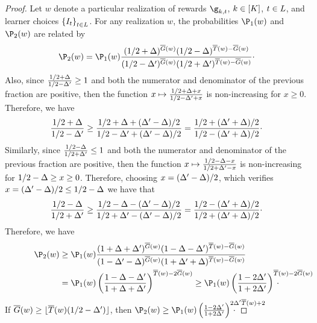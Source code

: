 \begin{proof}
	\noindent
	Let $w$ denote  a particular realization of rewards
	$\gainVector_{k,t}$, $k\in[K]$, $t\in L$, 
	and learner choices
	$\left\{I_t\right\}_{t\in L}$. For any realization
	$w$,
	the probabilities
	$\Pro_{1}(w)$ 
	and
	$\Pro_{2}(w)$
	are related by
	\[
	\Pro_{2}(w)
	=
	\Pro_{1}(w)\frac{(1/2+\gap)^{\sumlemma(w)} (1/2-\gap)^{\pullearlyPhase(w)-\sumlemma(w)}
	}{
		(1/2-\gap')^{\sumlemma(w)} (1/2+\gap')^{\pullearlyPhase(w)-\sumlemma(w)}}\cdot
	\]
	Also, since $\frac{1/2+\Delta}{1/2-\Delta'}\geq 1$ and both 
	the numerator and denominator of the previous fraction are 
	positive, then the function $x\mapsto\frac{1/2+\Delta+x}{1/2-\Delta'+x}$ 
	is non-increasing for $x\geq0$. Therefore, we have  
	\[
	\frac{1/2+\Delta}{1/2-\Delta'}
	\geq
	 \frac{1/2+\Delta+(\Delta'-\Delta)/2}{1/2-\Delta'+(\Delta'-\Delta)/2}
	 =
	  \frac{1/2+(\Delta'+\Delta)/2}{1/2-(\Delta'+\Delta)/2}\cdot
	\]
	Similarly, since $\frac{1/2-\Delta}{1/2+\Delta'}\leq 1$ 
	and both the numerator and denominator of the previous 
	fraction are positive, then the function 
	$x\mapsto\frac{1/2-\Delta-x}{1/2+\Delta'-x}$ is non-increasing 
	for $1/2-\Delta\geq x\geq0$. Therefore, choosing 
	$x=(\Delta'-\Delta)/2$, which verifies $x=(\Delta'-\Delta)/2\leq 1/2-\Delta$ we have  that
	\[
	\frac{1/2-\Delta}{1/2+\Delta'}
	\geq
	 \frac{1/2-\Delta-(\Delta'-\Delta)/2}{1/2+\Delta'-(\Delta'-\Delta)/2}
	 =
	  \frac{1/2-(\Delta'+\Delta)/2}{1/2+(\Delta'+\Delta)/2}\cdot
	\]
%	
	Therefore, we have 
	\begin{align*}
	\Pro_{2}(w)
	&\geq
	\Pro_{1}(w)
	\frac{(1+\gap+\gap')^{\sumlemma(w)} (1-\gap-\gap')^{\pullearlyPhase(w)-\sumlemma(w)}
	}{
		(1-\gap'-\gap)^{\sumlemma(w)} (1+\gap'+\gap)^{\pullearlyPhase(w)-\sumlemma(w)}}\\
	&=
	\Pro_{1}(w)
	\left(\frac{1-\gap-\gap'}{1+\gap+\gap'}\right)
	^{\pullearlyPhase(w)-2\sumlemma(w)}
	\geq
	\Pro_{1}(w)
	\left(\frac{1-2\gap'}{1+2\gap'}\right)^{\pullearlyPhase(w)
		-2\sumlemma(w)}\hspace{-4.5em}\cdot
	\end{align*}
	If 	$ \overline G(w) \geq \lfloor\overline T(w) (1/2-\Delta')\rfloor$, then
	$\Pro_{2}(w)
	\geq
	\Pro_{1}(w)
	\left(\frac{1-2\gap'}{1+2\gap'}\right)^{2\gap'\pullearlyPhase(w)+2}\hspace{-4em}\cdot$
	

\end{proof}
